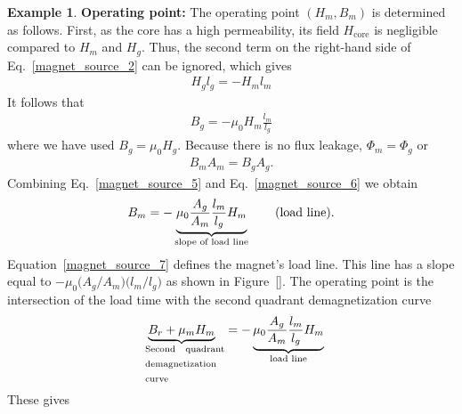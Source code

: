 \documentclass[11pt,a4paper,oneside]{book}
\numberwithin{equation}{section}
\theoremstyle{it}
\theoremstyle{definition}
\newtheorem{example}{Example}[section]
\begin{document}
\begin{example}
\textbf{Operating point:} The operating point $(H_m,B_m)$ is determined as follows. First, as the core has a high permeability, its field $H_\text{core}$ is negligible compared to $H_m$ and $H_g$. Thus, the second term on the right-hand side of Eq.~\eqref{magnet_source_2} can be ignored, which gives
\begin{equation}\label{magnet_source_4}
	{\begin{aligned}
		H_gl_g=-H_ml_m
	\end{aligned}}
\end{equation}
It follows that 
\begin{equation}\label{magnet_source_5}
	{\begin{aligned}
		B_g=-\mu_0H_m\frac{l_m}{l_g}
	\end{aligned}}
\end{equation}
where we have used $B_g=\mu_0H_g$. Because there is no flux leakage, $\Phi_m=\Phi_g$ or
\begin{equation}\label{magnet_source_6}
	{\begin{aligned}
		B_mA_m=B_gA_g.
	\end{aligned}}
\end{equation}
Combining Eq.~\eqref{magnet_source_5} and Eq.~\eqref{magnet_source_6} we obtain
\begin{equation}\label{magnet_source_7}
	{\begin{aligned}
			B_m=-\underbrace{\mu_0\frac{A_g}{A_m}\frac{l_m}{l_g}H_m}_\text{\normalfont slope of load line}\qquad\text{\normalfont (load line).}
	\end{aligned}}
\end{equation}
Equation~\ref{magnet_source_7} defines the magnet's load line. This line has a slope equal to $-\mu_0\big(A_g/A_m\big)\big(l_m/l_g\big)$ as shown in Figure~\ref{}. The operating point is the intersection of the load time with the second quadrant demagnetization curve
\begin{equation}\label{magnet_source_8}
	{\begin{aligned}
\underbrace{B_r+\mu_mH_m}_{\text{\normalfont\ \begin{centering} \parbox{8em}{Second quadrant demagnetization curve}\end{centering}}} = -\underbrace{\mu_0\frac{A_g}{A_m}\frac{l_m}{l_g}H_m}_{\text{\normalfont load line}}
	\end{aligned}}
\end{equation}
These gives 
\begin{equation}\label{magnet_source_9}
	{\begin{aligned}

\end{aligned}}
\end{equation}
\end{example}
\end{document}
